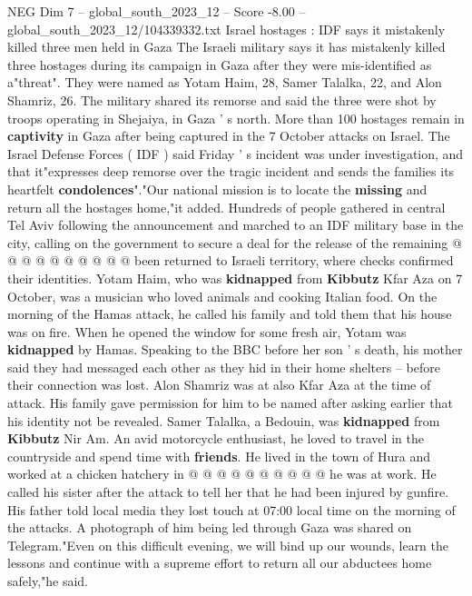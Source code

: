 \begin{textsample}{NEG Dim 7 – global\_south\_2023\_12 – Score -8.00 – global\_south\_2023\_12/104339332.txt}  \label{ex:f7_neg_413}
Israel hostages : IDF says it mistakenly killed three men held in Gaza The Israeli military says it has mistakenly killed three hostages during its campaign in Gaza after they were mis-identified as a"threat".
They were named as Yotam Haim, 28, Samer Talalka, 22, and Alon Shamriz, 26.
The military shared its remorse and said the three were shot by troops operating in Shejaiya, in Gaza ' s north.
More than 100 hostages remain in \textbf{captivity} in Gaza after being captured in the 7 October attacks on Israel.
The Israel Defense Forces ( IDF ) said Friday ' s incident was under investigation, and that it"expresses deep remorse over the tragic incident and sends the families its heartfelt \textbf{condolences}"."Our national mission is to locate the \textbf{missing} and return all the hostages home,"it added.
Hundreds of people gathered in central Tel Aviv following the announcement and marched to an IDF military base in the city, calling on the government to secure a deal for the release of the remaining @ @ @ @ @ @ @ @ @ @ been returned to Israeli territory, where checks confirmed their identities.
Yotam Haim, who was \textbf{kidnapped} from \textbf{Kibbutz} Kfar Aza on 7 October, was a musician who loved animals and cooking Italian food.
On the morning of the Hamas attack, he called his family and told them that his house was on fire.
When he opened the window for some fresh air, Yotam was \textbf{kidnapped} by Hamas.
Speaking to the BBC before her son ' s death, his mother said they had messaged each other as they hid in their home shelters -- before their connection was lost.
Alon Shamriz was at also Kfar Aza at the time of attack.
His family gave permission for him to be named after asking earlier that his identity not be revealed.
Samer Talalka, a Bedouin, was \textbf{kidnapped} from \textbf{Kibbutz} Nir Am.
An avid motorcycle enthusiast, he loved to travel in the countryside and spend time with \textbf{friends}.
He lived in the town of Hura and worked at a chicken hatchery in @ @ @ @ @ @ @ @ @ @ he was at work.
He called his sister after the attack to tell her that he had been injured by gunfire.
His father told local media they lost touch at 07:00 local time on the morning of the attacks.
A photograph of him being led through Gaza was shared on Telegram."Even on this difficult evening, we will bind up our wounds, learn the lessons and continue with a supreme effort to return all our abductees home safely,"he said.

\end{textsample}
